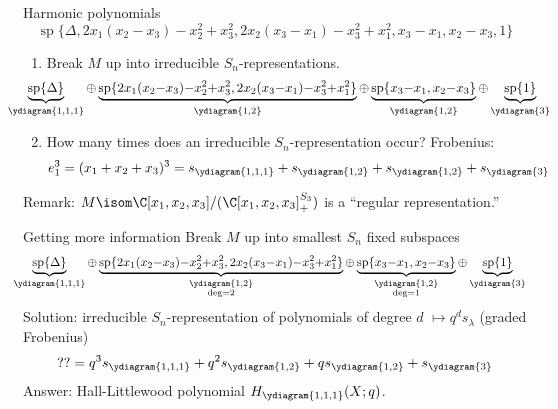 \documentclass[dvipsnames]{beamer}
\renewcommand{\Span}{\operatorname{sp}}
\theoremstyle{definition}
\newcounter{c}
\begin{document}
\begin{frame}{Harmonic polynomials}
\[
\Span\{\Delta, 2x_1(x_2-x_3)-x_2^2+x_3^2,
            2x_2(x_3-x_1)-x_3^2+x_1^2, 
       x_3-x_1, x_2-x_3,1\}
  \]\pause 
  \begin{enumerate}
\item Break \(M\) up into irreducible \(S_n\)-representations. \pause
  \[
    \hspace{-2.9em}
    \scalebox{0.95}{\(
      \underbrace{\Span\{\Delta\}}_{\ydiagram{1,1,1}} {\oplus} \underbrace{\Span\{2x_1(x_2{-}x_3){-}x_2^2{+}x_3^2,
        2x_2(x_3{-}x_1){-}x_3^2{+}x_1^2\}}_{\ydiagram{1,2}} {\oplus}
      \underbrace{\Span\{x_3{-}x_1, x_2{-}x_3\}}_{\ydiagram{1,2}} {\oplus} \underbrace{\Span\{1\}}_{\ydiagram{3}}\)}
  \]\pause
  \item How many times does an irreducible \(S_n\)-representation occur? \pause
    Frobenius: \pause
    \[
      e_1^3 = (x_1+x_2+x_3)^3 = s_{\ydiagram{1,1,1}} + s_{\ydiagram{1,2}} +
      s_{\ydiagram{1,2}} + s_{\ydiagram{3}}
    \]
  \end{enumerate}
  \pause
  Remark: \(M \isom \C[x_1,x_2,x_3]/(\C[x_1,x_2,x_3]^{S_3}_+)\) is a
  ``regular representation.''
\end{frame}
\begin{frame}{Getting more information}
  \pause
  Break \(M\) up into smallest \(S_n\) fixed subspaces 
  \[
    \hspace{-0.75em}
    \scalebox{0.95}{\(
      \underbrace{\Span\{\Delta\}}_{\ydiagram{1,1,1}} {\oplus} \underbrace{\Span\{2x_1(x_2{-}x_3){-}x_2^2{+}x_3^2,
        2x_2(x_3{-}x_1){-}x_3^2{+}x_1^2\}}_{\substack{\ydiagram{1,2}\\\deg
        = 2}} {\oplus}
      \underbrace{\Span\{x_3{-}x_1, x_2{-}x_3\}}_{\substack{\ydiagram{1,2}\\\deg=1}} {\oplus} \underbrace{\Span\{1\}}_{\ydiagram{3}}\)}
  \]
  \pause
  Solution: irreducible \(S_n\)-representation of polynomials of degree \(d\) \(\mapsto q^d
  s_\lambda\) (graded Frobenius)\[
    ?? = q^3 s_{\ydiagram{1,1,1}} + q^2 s_{\ydiagram{1,2}} + q
    s_{\ydiagram{1,2}} + s_{\ydiagram{3}}
  \]\pause
  Answer: Hall-Littlewood polynomial \(H_{\ydiagram{1,1,1}}(X;q)\).
\end{frame}
\end{document}
